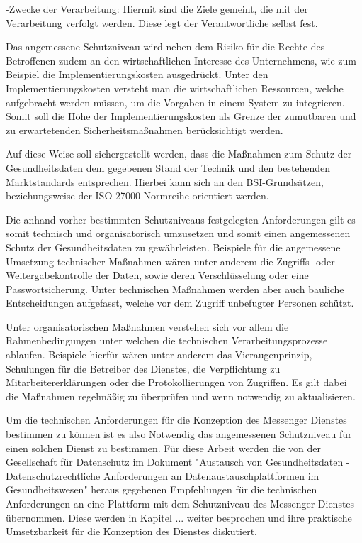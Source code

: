 -Zwecke der Verarbeitung: Hiermit sind die Ziele gemeint, die mit der Verarbeitung verfolgt werden. Diese legt der Verantwortliche selbst fest.

Das angemessene Schutzniveau wird neben dem Risiko für die Rechte des Betroffenen zudem an den wirtschaftlichen Interesse des Unternehmens, wie zum Beispiel die Implementierungskosten ausgedrückt. Unter den Implementierungskosten versteht man die wirtschaftlichen Ressourcen, welche aufgebracht werden müssen, um die Vorgaben in einem System zu integrieren. Somit soll die Höhe der Implementierungskosten als Grenze der zumutbaren und zu erwartetenden Sicherheitsmaßnahmen berücksichtigt werden.

Auf diese Weise soll sichergestellt werden, dass die Maßnahmen zum Schutz der Gesundheitsdaten dem gegebenen Stand der Technik und den bestehenden Marktstandards entsprechen. Hierbei kann sich an den BSI-Grundsätzen, beziehungsweise der ISO 27000-Normreihe orientiert werden.

Die anhand vorher bestimmten Schutzniveaus festgelegten Anforderungen gilt es somit technisch und organisatorisch umzusetzen und somit einen angemessenen Schutz der Gesundheitsdaten zu gewährleisten. Beispiele für die angemessene Umsetzung technischer Maßnahmen wären unter anderem die Zugriffs- oder Weitergabekontrolle der Daten, sowie deren Verschlüsselung oder eine Passwortsicherung. Unter technischen Maßnahmen werden aber auch bauliche Entscheidungen aufgefasst, welche vor dem Zugriff unbefugter Personen schützt.

Unter organisatorischen Maßnahmen verstehen sich vor allem die Rahmenbedingungen unter welchen die technischen Verarbeitungsprozesse ablaufen. Beispiele hierfür wären unter anderem das Vieraugenprinzip, Schulungen für die Betreiber des Dienstes, die Verpflichtung zu Mitarbeitererklärungen oder die Protokollierungen von Zugriffen.
Es gilt dabei die Maßnahmen regelmäßig zu überprüfen und wenn notwendig zu aktualisieren. 

Um die technischen Anforderungen für die Konzeption des Messenger Dienstes bestimmen zu können ist es also Notwendig das angemessenen Schutzniveau für einen solchen Dienst zu bestimmen. Für diese Arbeit werden die von der Gesellschaft für Datenschutz im Dokument "Austausch von Gesundheitsdaten -  Datenschutzrechtliche Anforderungen an Datenaustauschplattformen im Gesundheitswesen" heraus gegebenen Empfehlungen für die technischen Anforderungen an eine Plattform mit dem Schutzniveau des Messenger Dienstes übernommen. Diese werden in Kapitel ... weiter besprochen und ihre praktische Umsetzbarkeit für die Konzeption des Dienstes diskutiert. 

